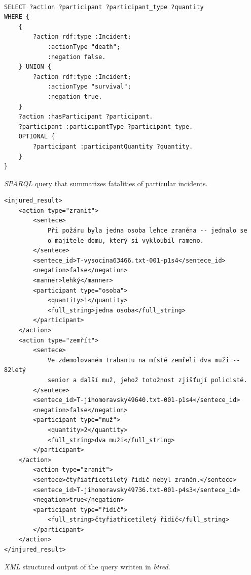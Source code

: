 \begin{listing}[ht]
\begin{verbatim}

SELECT ?action ?participant ?participant_type ?quantity
WHERE {
	{
		?action rdf:type :Incident;
			:actionType "death";
			:negation false.
	} UNION {
		?action rdf:type :Incident;
			:actionType "survival";
			:negation true.
	}
	?action :hasParticipant ?participant.
	?participant :participantType ?participant_type.
	OPTIONAL {
		?participant :participantQuantity ?quantity.
	}
}
\end{verbatim}
\caption{\emph{SPARQL} query that summarizes fatalities of particular incidents.}
\label{lst:sparql_aggregation}
\end{listing}



\begin{listing}[ht]
\begin{verbatim}
<injured_result>
	<action type="zranit">
		<sentece>
			Při požáru byla jedna osoba lehce zraněna -- jednalo se
			o majitele domu, který si vykloubil rameno.
		</sentece>
		<sentece_id>T-vysocina63466.txt-001-p1s4</sentece_id>
		<negation>false</negation>
		<manner>lehký</manner>
		<participant type="osoba">
			<quantity>1</quantity>
			<full_string>jedna osoba</full_string>
		</participant>
	</action>
	<action type="zemřít">
		<sentece>
			Ve zdemolovaném trabantu na místě zemřeli dva muži -- 82letý
			senior a další muž, jehož totožnost zjišťují policisté.
		</sentece>
		<sentece_id>T-jihomoravsky49640.txt-001-p1s4</sentece_id>
		<negation>false</negation>
		<participant type="muž">
			<quantity>2</quantity>
			<full_string>dva muži</full_string>
		</participant>
	</action>
		<action type="zranit">
		<sentece>čtyřiatřicetiletý řidič nebyl zraněn.</sentece>
		<sentece_id>T-jihomoravsky49736.txt-001-p4s3</sentece_id>
		<negation>true</negation>
		<participant type="řidič">
			<full_string>čtyřiatřicetiletý řidič</full_string>
		</participant>
	</action>
</injured_result>
\end{verbatim}
\caption{\emph{XML} structured output of the query written in \emph{btred}.}
\label{lst:btred_xml}
\end{listing}




